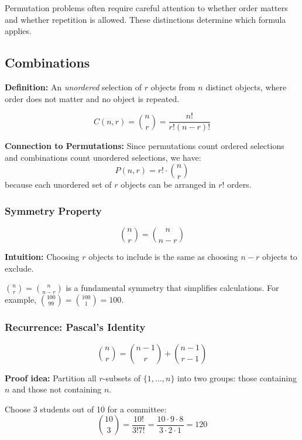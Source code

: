 \documentclass[12pt]{extarticle}
\begin{document}
\begin{remarkbox}
Permutation problems often require careful attention to whether order matters and whether repetition is allowed. These distinctions determine which formula applies.
\end{remarkbox}
\newpage
\subsection{Combinations}
\textbf{Definition:} An \textit{unordered} selection of $r$ objects from $n$ distinct objects, where order does not matter and no object is repeated.

\[
C(n,r) = \binom{n}{r} = \frac{n!}{r!(n-r)!}
\]

\textbf{Connection to Permutations:} Since permutations count ordered selections and combinations count unordered selections, we have:
\[
P(n, r) = r! \cdot \binom{n}{r}
\]
because each unordered set of $r$ objects can be arranged in $r!$ orders.

\subsubsection{Symmetry Property}

\[
\binom{n}{r} = \binom{n}{n-r}
\]

\textbf{Intuition:} Choosing $r$ objects to include is the same as choosing $n-r$ objects to exclude.

\begin{remarkbox}
$\binom{n}{r} = \binom{n}{n-r}$ is a fundamental symmetry that simplifies calculations. For example, $\binom{100}{99} = \binom{100}{1} = 100$.
\end{remarkbox}

\subsubsection{Recurrence: Pascal's Identity}

\[
\binom{n}{r} = \binom{n-1}{r} + \binom{n-1}{r-1}
\]

\textbf{Proof idea:} Partition all $r$-subsets of $\{1,\ldots,n\}$ into two groups: those containing $n$ and those not containing $n$.

\begin{examplebox}
Choose 3 students out of 10 for a committee:
\[
\binom{10}{3} = \frac{10!}{3!7!} = \frac{10 \cdot 9 \cdot 8}{3 \cdot 2 \cdot 1} = 120
\]
\end{examplebox}
\end{document}
